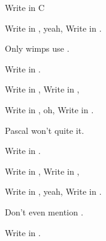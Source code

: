 \begin{SBSong}{Write in C}
\begin{SBChorus}
    Write in , yeah, Write in .

    Only wimps use .

    Write in . 
  \end{SBChorus}
  \begin{SBChorus}
    Write in , Write in ,

    Write in , oh, Write in .

    Pascal won't quite  it.

    Write in . 
  \end{SBChorus}
  \begin{SBChorus}
    Write in , Write in ,

    Write in , yeah, Write in .

    Don't even mention .

    Write in . 
  \end{SBChorus}
\end{SBSong}